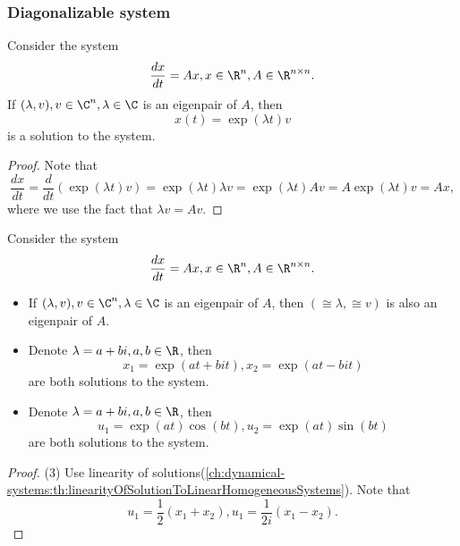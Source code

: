 \begin{refsection}
\subsubsection{Diagonalizable system}

\begin{lemma}\label{ch:dynamical-systems:th:EigenPairAndSolutionToLinearSystem}
Consider the system
$$\frac{dx}{dt} = Ax, x\in \R^n, A\in \R^{n\times n}.$$
If $(\lambda, v),v\in \C^n, \lambda\in \C$ is an eigenpair of $A$, then 
$$x(t) = \exp(\lambda t) v$$	
is a solution to the system.
\end{lemma}
\begin{proof}
Note that	
$$\frac{dx}{dt} = \frac{d}{dt}(\exp(\lambda t)v)= \exp(\lambda t)\lambda v = \exp(\lambda t)Av = A\exp(\lambda t)v = Ax,$$
where we use the fact that $\lambda v = Av$.
\end{proof}

\begin{lemma}
Consider the system
$$\frac{dx}{dt} = Ax, x\in \R^n, A\in \R^{n\times n}.$$
\begin{itemize}
	\item If $(\lambda, v),v\in \C^n, \lambda\in \C$ is an eigenpair of $A$, then 
	$(\cong{\lambda}, \cong{v})$ is also an eigenpair of $A$.
	\item Denote $\lambda = a + bi, a,b\in \R$, then
	$$x_1 = \exp(at+bit), x_2=\exp(at - bit)$$	
	are both solutions to the system.
	\item Denote $\lambda = a + bi, a,b\in \R$, then
	$$u_1 = \exp(at)\cos(bt), u_2=\exp(at)\sin(bt)$$	
	are both solutions to the system.
\end{itemize}
\end{lemma}
\begin{proof}


(3) Use linearity of solutions(\autoref{ch:dynamical-systems:th:linearityOfSolutionToLinearHomogeneousSystems}). Note that
$$u_1 = \frac{1}{2}(x_1+x_2),u_1 = \frac{1}{2i}(x_1-x_2).$$
\end{proof}


\end{refsection}
